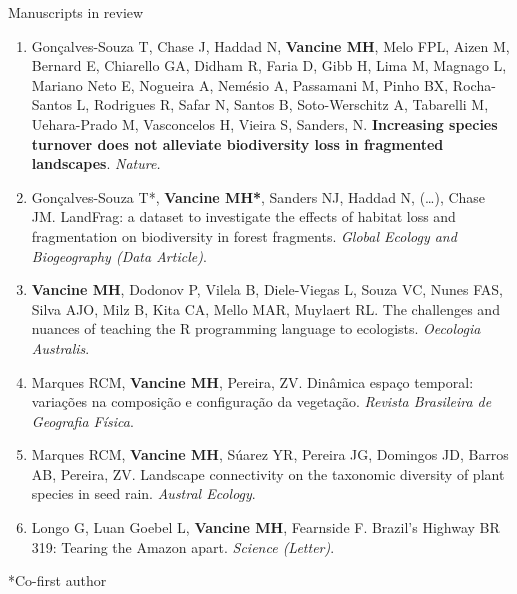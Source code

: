 \documentclass{resume}
\begin{document}
\begin{rSection}{Manuscripts in review}
\begin{enumerate}
\item Gonçalves-Souza T, Chase J, Haddad N, {\bf Vancine MH}, Melo FPL, Aizen M, Bernard E, Chiarello GA, Didham R, Faria D, Gibb H, Lima M, Magnago L, Mariano Neto E, Nogueira A, Nemésio A, Passamani M, Pinho BX, Rocha-Santos L, Rodrigues R, Safar N, Santos B, Soto-Werschitz A, Tabarelli M, Uehara-Prado M, Vasconcelos H, Vieira S, Sanders, N. {\bf Increasing species turnover does not alleviate biodiversity loss in fragmented landscapes}. {\it Nature.}

\item Gonçalves-Souza T*, {\bf Vancine MH*}, Sanders NJ, Haddad N, (…), Chase JM. LandFrag: a dataset to investigate the effects of habitat loss and fragmentation on biodiversity in forest fragments. {\it Global Ecology and Biogeography (Data Article)}.

\item {\bf Vancine MH}, Dodonov P, Vilela B, Diele-Viegas L, Souza VC, Nunes FAS, Silva AJO, Milz B, Kita CA, Mello MAR, Muylaert RL. The challenges and nuances of teaching the R programming language to ecologists. {\it Oecologia Australis}.

\item Marques RCM, {\bf Vancine MH}, Pereira, ZV. Dinâmica espaço temporal: variações na composição e configuração da vegetação. {\it Revista Brasileira de Geografia Física}.

\item Marques RCM, {\bf Vancine MH}, Súarez YR, Pereira JG, Domingos JD, Barros AB, Pereira, ZV. Landscape connectivity on the taxonomic diversity of plant species in seed rain. {\it Austral Ecology}.

\item Longo G, Luan Goebel L, {\bf Vancine MH}, Fearnside F. Brazil’s Highway BR 319: Tearing the Amazon apart. {\it Science (Letter)}.

\end{enumerate} 

*Co-first author

\end{rSection}

\end{document}
